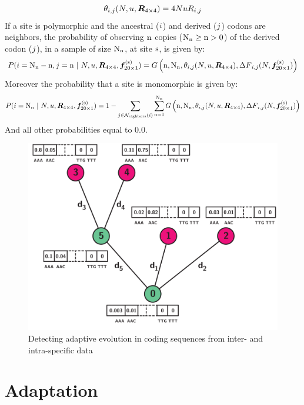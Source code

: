 \begin{equation}
\theta_{{i}, {j}}(N, u, \bm{R}_{4\times4}) = 4 N u R_{{i}, {j}}
\end{equation}
If a site is polymorphic and the ancestral (${i}$) and derived (${j}$) codons are neighbors, the probability of observing $\text{n}$ copies ($\text{N}_{\text{n}} \geq \text{n} > 0$) of the derived codon (${j}$), in a sample of size $\text{N}_{\text{n}}$, at site $\text{s}$, is given by:
\begin{equation}
P({i}=\text{N}_{\text{n}}-\text{n},{j}=\text{n} \ |\ N, u, \bm{R}_{4\times4}, \bm{f}_{20\times1}^{(\text{s})}) = G\left(\text{n}, \text{N}_{\text{n}}, \theta_{{i}, {j}}(N, u, \bm{R}_{4\times4}), {\Delta F}_{{i}, {j}}(N, \bm{f}_{20\times1}^{(\text{s})}) \right)
\end{equation}
Moreover the probability that a site is monomorphic is given by:
\begin{equation}
P(\ci= \samples \ |\ \Ne, u, \Mutmatrix, \Fit\siteexp) = 1 - \sum_{\cj \in \Ni} \sum_{\copies=1}^{\samples} G\left(\copies, \samples, \theta_{\itoj}(\Ne, u, \Mutmatrix), \scaledselcoef_{\itoj}(\Ne, \Fit\siteexp)\right)
\end{equation}
And all other probabilities equal to $0.0$.

\begin{figure}[thbp]
	\begin{center}
		\includegraphics[width=\textwidth] {figures/pruning-polymorphism}
	\end{center}
	\caption{Detecting adaptive evolution in coding sequences from inter- and intra-specific data}
\end{figure}

\section{Adaptation}


